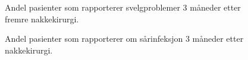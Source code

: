\documentclass [norsk,a4paper,twoside]{article}\usepackage[]{graphicx}\usepackage[]{color}
\begin{document}
            \begin{figure}[ht]
            \caption{\label{fig:NakkeSvelg3mndSh} Andel pasienter som rapporterer svelgproblemer 3 måneder etter fremre nakkekirurgi.}
            \end{figure}
            
            \begin{figure}[ht]
            \caption{\label{fig:NakkeKomplinfek3mndSh} Andel pasienter som rapporterer om sårinfeksjon 3 måneder etter nakkekirurgi.}
            \end{figure}
            
            \clearpage
            
      
\end{document}
